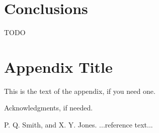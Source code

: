 \documentclass{sigplanconf}
\begin{document}
\section{Conclusions}

TODO

\appendix
\section{Appendix Title}

This is the text of the appendix, if you need one.

\acks

Acknowledgments, if needed.





\begin{thebibliography}{}
\softraggedright

P. Q. Smith, and X. Y. Jones. ...reference text...

\end{thebibliography}
\end{document}
